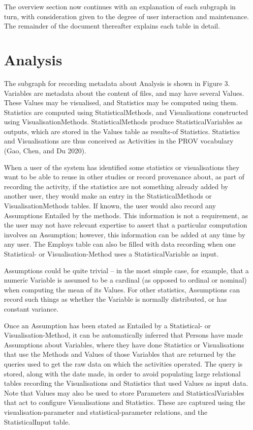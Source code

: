 The overview section now continues with an explanation of each subgraph
in turn, with consideration given to the degree of user interaction and
maintenance. The remainder of the document thereafter explains each
table in detail.

\section{Analysis}\label{analysis}

The subgraph for recording metadata about Analysis is shown in Figure 3.
Variables are metadata about the content of files, and may have several
Values. These Values may be visualised, and Statistics may be computed
using them. Statistics are computed using StatisticalMethods, and
Visualisations constructed using VisualisationMethods.
StatisticalMethods produce StatisticalVariables as outputs, which are
stored in the Values table as results-of Statistics. Statistics and
Visualisations are thus conceived as Activities in the PROV vocabulary
(Gao, Chen, and Du 2020).

When a user of the system has identified some statistics or
visualisations they want to be able to reuse in other studies or record
provenance about, as part of recording the activity, if the statistics
are not something already added by another user, they would make an
entry in the StatisticalMethods or VisualisationMethods tables. If
known, the user would also record any Assumptions Entailed by the
methods. This information is not a requirement, as the user may not have
relevant expertise to assert that a particular computation involves an
Assumption; however, this information can be added at any time by any
user. The Employs table can also be filled with data recording when one
Statistical- or Visualisation-Method uses a StatisticalVariable as
input.

Assumptions could be quite trivial -- in the most simple case, for
example, that a numeric Variable is assumed to be a cardinal (as opposed
to ordinal or nominal) when computing the mean of its Values. For other
statistics, Assumptions can record such things as whether the Variable
is normally distributed, or has constant variance.

Once an Assumption has been stated as Entailed by a Statistical- or
Visualisation-Method, it can be automatically inferred that Persons have
made Assumptions about Variables, where they have done Statistics or
Visualisations that use the Methods and Values of those Variables that
are returned by the queries used to get the raw data on which the
activities operated. The query is stored, along with the date made, in
order to avoid populating large relational tables recording the
Visualisations and Statistics that used Values as input data. Note that
Values may also be used to store Parameters and StatisticalVariables
that act to configure Visualisations and Statistics. These are captured
using the visualisation-parameter and statistical-parameter relations,
and the StatisticalInput table.

